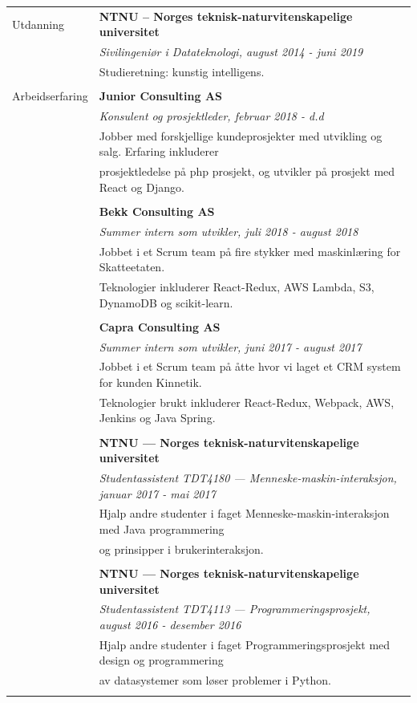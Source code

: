 \documentclass[letterpaper,10pt,oneside]{article}
\begin{document}
\noindent \begin{longtable}{@{} l l}
  \Large{Utdanning} & \textbf{NTNU – Norges teknisk-naturvitenskapelige universitet} \\
  & \textit{Sivilingeniør i Datateknologi, august 2014 - juni 2019}\\
     & Studieretning: kunstig intelligens.\\
     & \\
     \Large{Arbeidserfaring} 
     & \textbf{Junior Consulting AS} \\
     & \textit{Konsulent og prosjektleder, februar 2018 - d.d} \\
     & Jobber med forskjellige kundeprosjekter med utvikling og salg. Erfaring inkluderer \\
     & prosjektledelse på php prosjekt, og utvikler på prosjekt med React og Django.\\
     & \\
     & \textbf{Bekk Consulting AS} \\
     & \textit{Summer intern som utvikler, juli 2018 - august 2018} \\
     & Jobbet i et Scrum team på fire stykker med maskinlæring for Skatteetaten.\\
     & Teknologier inkluderer React-Redux, AWS Lambda, S3, DynamoDB og scikit-learn.\\
     & \\
     & \textbf{Capra Consulting AS} \\
     & \textit{Summer intern som utvikler, juni 2017 - august 2017} \\
     & Jobbet i et Scrum team på åtte hvor vi laget et CRM system for kunden Kinnetik.\\
     & Teknologier brukt inkluderer React-Redux, Webpack, AWS, Jenkins og Java Spring.\\
     & \\
     & \textbf{NTNU --- Norges teknisk-naturvitenskapelige universitet} \\
     & \textit{Studentassistent TDT4180 --- Menneske-maskin-interaksjon, januar 2017 - mai 2017}\\
     & Hjalp andre studenter i faget Menneske-maskin-interaksjon med Java programmering \\
     & og prinsipper i brukerinteraksjon.\\
     & \\
     & \textbf{NTNU --- Norges teknisk-naturvitenskapelige universitet} \\
     & \textit{Studentassistent TDT4113 --- Programmeringsprosjekt, august 2016 - desember 2016}\\
     & Hjalp andre studenter i faget Programmeringsprosjekt med design og programmering \\
     & av datasystemer som løser problemer i Python.\\
     & \\


\end{longtable}
\end{document}
